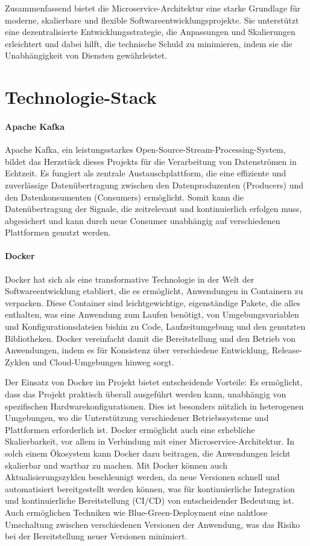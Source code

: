 Zusammenfassend bietet die Microservice-Architektur eine starke Grundlage für moderne, skalierbare und flexible Softwareentwicklungsprojekte. 
Sie unterstützt eine dezentralisierte Entwicklungsstrategie, die Anpassungen und Skalierungen erleichtert und dabei hilft, die technische Schuld zu minimieren, indem sie die Unabhängigkeit von Diensten gewährleistet.

\section{Technologie-Stack} 
\paragraph{Apache Kafka}
Apache Kafka, ein leistungsstarkes Open-Source-Stream-Processing-System, bildet das Herzstück dieses Projekts für die Verarbeitung von Datenströmen in Echtzeit. 
Es fungiert als zentrale Austauschplattform, die eine effiziente und zuverlässige Datenübertragung zwischen den Datenproduzenten (Producers) und den Datenkonsumenten (Consumers) ermöglicht. 
Somit kann die Datenübertragung der Signale, die zeitrelevant und kontinuierlich erfolgen muss, abgesichert und kann durch neue Consumer unabhängig auf verschiedenen Plattformen genutzt werden.

\paragraph{Docker}
\label{sec:docker}
Docker hat sich als eine transformative Technologie in der Welt der Softwareentwicklung etabliert, die es ermöglicht, Anwendungen in Containern zu verpacken. 
Diese Container sind leichtgewichtige, eigenständige Pakete, die alles enthalten, was eine Anwendung zum Laufen benötigt, von Umgebungsvariablen und Konfigurationsdateien bishin zu Code, Laufzeitumgebung und den genutzten Bibliotheken. 
Docker vereinfacht damit die Bereitstellung und den Betrieb von Anwendungen, indem es für Konsistenz über verschiedene Entwicklung, Release-Zyklen und Cloud-Umgebungen hinweg sorgt.

Der Einsatz von Docker im Projekt bietet entscheidende Vorteile: Es ermöglicht, dass das Projekt praktisch überall ausgeführt werden kann, unabhängig von spezifischen Hardwarekonfigurationen. 
Dies ist besonders nützlich in heterogenen Umgebungen, wo die Unterstützung verschiedener Betriebssysteme und Plattformen erforderlich ist. Docker ermöglicht auch eine erhebliche Skalierbarkeit, 
vor allem in Verbindung mit einer Microservice-Architektur. In solch einem Ökosystem kann Docker dazu beitragen, die Anwendungen leicht skalierbar und wartbar zu machen. 
Mit Docker können auch Aktualisierungszyklen beschleunigt werden, da neue Versionen schnell und automatisiert bereitgestellt werden können, was für 
kontinuierliche Integration und kontinuierliche Bereitstellung (CI/CD) von entscheidender Bedeutung ist. 
Auch ermöglichen Techniken wie Blue-Green-Deployment eine nahtlose Umschaltung zwischen verschiedenen Versionen der Anwendung, was das Risiko bei der Bereitstellung neuer Versionen minimiert.

